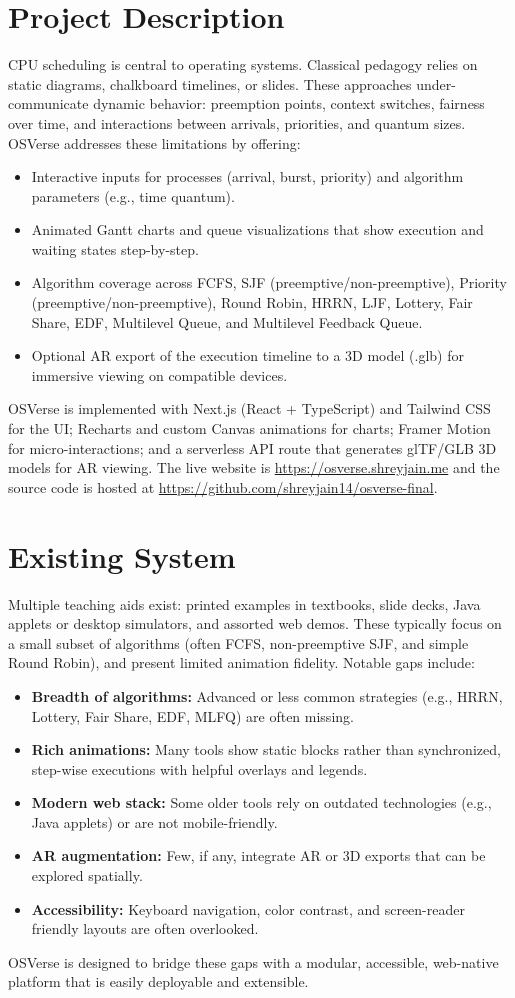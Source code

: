 \documentclass[12pt,a4paper,oneside]{report}
\newcommand{\githubURL}{https://github.com/shreyjain14/osverse-final}
\newcommand{\projectURL}{https://osverse.shreyjain.me}
\begin{document}
\section{Project Description}
CPU scheduling is central to operating systems. Classical pedagogy relies on static diagrams, chalkboard timelines, or slides. These approaches under-communicate dynamic behavior: preemption points, context switches, fairness over time, and interactions between arrivals, priorities, and quantum sizes. OSVerse addresses these limitations by offering:
\begin{itemize}
  \item Interactive inputs for processes (arrival, burst, priority) and algorithm parameters (e.g., time quantum).
  \item Animated Gantt charts and queue visualizations that show execution and waiting states step-by-step.
  \item Algorithm coverage across FCFS, SJF (preemptive/non-preemptive), Priority (preemptive/non-preemptive), Round Robin, HRRN, LJF, Lottery, Fair Share, EDF, Multilevel Queue, and Multilevel Feedback Queue.
  \item Optional AR export of the execution timeline to a 3D model (.glb) for immersive viewing on compatible devices.
\end{itemize}
OSVerse is implemented with Next.js (React + TypeScript) and Tailwind CSS for the UI; Recharts and custom Canvas animations for charts; Framer Motion for micro-interactions; and a serverless API route that generates glTF/GLB 3D models for AR viewing. The live website is \href{\projectURL}{\projectURL} and the source code is hosted at \href{\githubURL}{\githubURL}.

\section{Existing System}
Multiple teaching aids exist: printed examples in textbooks, slide decks, Java applets or desktop simulators, and assorted web demos. These typically focus on a small subset of algorithms (often FCFS, non-preemptive SJF, and simple Round Robin), and present limited animation fidelity. Notable gaps include:
\begin{itemize}
  \item \textbf{Breadth of algorithms:} Advanced or less common strategies (e.g., HRRN, Lottery, Fair Share, EDF, MLFQ) are often missing.
  \item \textbf{Rich animations:} Many tools show static blocks rather than synchronized, step-wise executions with helpful overlays and legends.
  \item \textbf{Modern web stack:} Some older tools rely on outdated technologies (e.g., Java applets) or are not mobile-friendly.
  \item \textbf{AR augmentation:} Few, if any, integrate AR or 3D exports that can be explored spatially.
  \item \textbf{Accessibility:} Keyboard navigation, color contrast, and screen-reader friendly layouts are often overlooked.
\end{itemize}
OSVerse is designed to bridge these gaps with a modular, accessible, web-native platform that is easily deployable and extensible.
\end{document}

